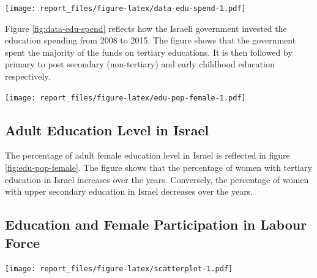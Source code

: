 \documentclass[11pt,a4paper,]{article}
\let\origfigure\figure
\let\endorigfigure\endfigure
\renewenvironment{figure}[1][2] {
    \expandafter\origfigure\expandafter[H]
} {
    \endorigfigure
}%
\begin{document}
\begin{figure}
\centering
\texttt{[image: report\_files/figure-latex/data-edu-spend-1.pdf]}
\caption{\label{fig:data-edu-spend}Education Spending in Israel}
\end{figure}

Figure \ref{fig:data-edu-spend} reflects how the Israeli government
invested the education spending from 2008 to 2015. The figure shows that
the government spent the majority of the funds on tertiary educations.
It is then followed by primary to post secondary (non-tertiary) and
early childhood education respectively.

\texttt{[image: report\_files/figure-latex/edu-pop-female-1.pdf]}
\subsection*{Adult Education Level in Israel}

The percentage of adult female education level in Israel is reflected in
figure \ref{fig:edu-pop-female}. The figure shows that the percentage of
women with tertiary education in Israel increases over the years.
Conversely, the percentage of women with upper secondary education in
Israel decreases over the years.

\subsection*{Education and Female Participation in Labour Force}

\begin{figure}
\centering
\texttt{[image: report\_files/figure-latex/scatterplot-1.pdf]}
\caption{\label{fig:scatterplot}Scatterplot of Female Labour Participation
Ratio and Adult Women Education Level}
\end{figure}
\end{document}
